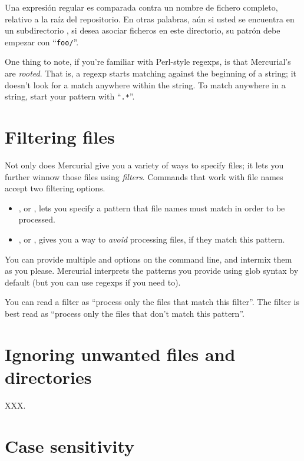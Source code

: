 Una expresión regular es comparada contra un nombre de fichero
completo, relativo a la raíz del repositorio. En otras palabras, aún
si usted se encuentra en un subdirectorio , si desea
asociar ficheros en este directorio, su patrón debe empezar con
``\texttt{foo/}''.

One thing to note, if you're familiar with Perl-style regexps, is that
Mercurial's are \emph{rooted}.  That is, a regexp starts matching
against the beginning of a string; it doesn't look for a match
anywhere within the string.  To match anywhere in a string, start
your pattern with ``\texttt{.*}''.

\section{Filtering files}

Not only does Mercurial give you a variety of ways to specify files;
it lets you further winnow those files using \emph{filters}.  Commands
that work with file names accept two filtering options.
\begin{itemize}
\item {}, or , lets you specify a pattern
  that file names must match in order to be processed.
\item {}, or , gives you a way to
  \emph{avoid} processing files, if they match this pattern.
\end{itemize}
You can provide multiple  and  options on the
command line, and intermix them as you please.  Mercurial interprets
the patterns you provide using glob syntax by default (but you can use
regexps if you need to).

You can read a  filter as ``process only the files that
match this filter''.
The  filter is best read as ``process only the files that
don't match this pattern''.

\section{Ignoring unwanted files and directories}

XXX.

\section{Case sensitivity}
\label{sec:names:case}

